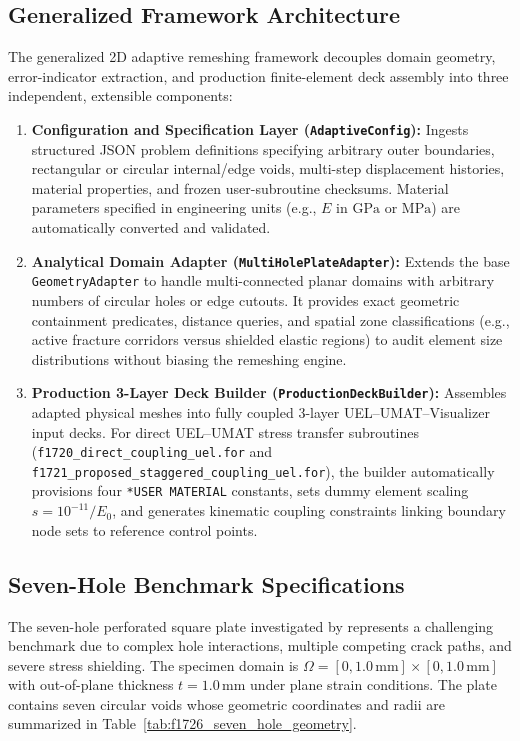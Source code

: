 \subsection{Generalized Framework Architecture}
\label{subsec:f1726_framework_arch}

The generalized 2D adaptive remeshing framework decouples domain geometry, error-indicator extraction, and production finite-element deck assembly into three independent, extensible components:
\begin{enumerate}
  \item \textbf{Configuration and Specification Layer (\texttt{AdaptiveConfig}):} Ingests structured JSON problem definitions specifying arbitrary outer boundaries, rectangular or circular internal/edge voids, multi-step displacement histories, material properties, and frozen user-subroutine checksums. Material parameters specified in engineering units (e.g., $E$ in $\mathrm{GPa}$ or $\mathrm{MPa}$) are automatically converted and validated.
  \item \textbf{Analytical Domain Adapter (\texttt{MultiHolePlateAdapter}):} Extends the base \texttt{GeometryAdapter} to handle multi-connected planar domains with arbitrary numbers of circular holes or edge cutouts. It provides exact geometric containment predicates, distance queries, and spatial zone classifications (e.g., active fracture corridors versus shielded elastic regions) to audit element size distributions without biasing the remeshing engine.
  \item \textbf{Production 3-Layer Deck Builder (\texttt{ProductionDeckBuilder}):} Assembles adapted physical meshes into fully coupled 3-layer UEL--UMAT--Visualizer input decks. For direct UEL--UMAT stress transfer subroutines (\texttt{f1720\_direct\_coupling\_uel.for} and \texttt{f1721\_proposed\_staggered\_coupling\_uel.for}), the builder automatically provisions four \texttt{*USER MATERIAL} constants, sets dummy element scaling $s = 10^{-11}/E_0$, and generates kinematic coupling constraints linking boundary node sets to reference control points.
\end{enumerate}

\subsection{Seven-Hole Benchmark Specifications}
\label{subsec:f1726_benchmark_spec}

The seven-hole perforated square plate investigated by \citet[Section~4.6]{pandey2025} represents a challenging benchmark due to complex hole interactions, multiple competing crack paths, and severe stress shielding. The specimen domain is $\Omega = [0, 1.0\,\mathrm{mm}] \times [0, 1.0\,\mathrm{mm}]$ with out-of-plane thickness $t = 1.0\,\mathrm{mm}$ under plane strain conditions. The plate contains seven circular voids whose geometric coordinates and radii are summarized in Table~\ref{tab:f1726_seven_hole_geometry}.

